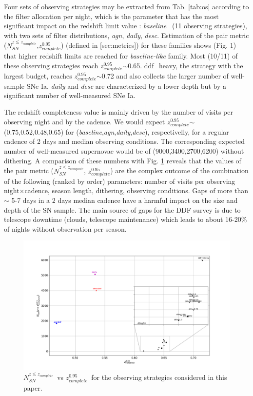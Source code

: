 \documentclass[skiphelvet,twocolumn]{lsstdescnote}
\newcommand{\sne}{{SNe Ia}}
\newcommand{\nsncomp}{{$N_{SN}^{z\leq z_{complete}}$}}
\newcommand{\zcompb}{\mbox{$z_{complete}^{0.95}$}}
\newcommand{\osfamily}[1]{{\it #1}}
\begin{document}

%
%
%
Four sets of observing strategies may be extracted from Tab. \ref{tab:os} according to the filter allocation per night, which is the parameter that has the most significant impact on the redshift limit value : \osfamily{baseline}~ (11 observing strategies), with two sets of filter distributions, \osfamily{agn}, \osfamily{daily}, \osfamily{desc}. Estimation of the pair metric (\nsncomp,\zcompb) (defined in \ref{sec:metrics}) for these families shows (Fig. \ref{fig:nsn_zlim_zoom}) that higher redshift limits are reached for \osfamily{baseline-like} family. Most (10/11) of these observing strategies reach \zcompb$\sim$0.65. ddf\_heavy, the strategy with the largest budget, reaches \zcompb$\sim$0.72 and also collects the larger number of well-sample \sne. \osfamily{daily} and \osfamily{desc} are characterized by a lower depth but by a significant number of well-measured \sne.\par
The redshift completeness value is mainly driven by the number of visits per observing night and by the cadence. We would expect \zcompb$\sim$(0.75,0.52,0.48,0.65) for (\osfamily{baseline},\osfamily{agn},\osfamily{daily},\osfamily{desc}), respectivelly, for a regular cadence of 2 days and median observing conditions. The corresponding expected number of well-measured supernovae would be of (9000,3400,2700,6200) without dithering. A comparison of these numbers with Fig. \ref{fig:nsn_zlim_zoom} reveals that the values of the pair metric (\nsncomp, \zcompb) are the complex outcome of the combination of the following (ranked by order) parameters: number of visits per observing night$\times$cadence, season length, dithering, observing conditions. Gaps of more than $\sim$ 5-7 days in a 2 days median cadence have a harmful
impact on the size and depth of the SN sample. The main source of gaps for the DDF survey is due to telescope downtime (clouds, telescope maintenance) which leads to about 16-20$\%$ of nights without observation per season.  

\begin{figure}[htbp]
\begin{center}
  \includegraphics[width=1.\textwidth]{nsn_zlim_zoom.png}
 \caption{\nsncomp~vs \zcompb~for the observing strategies considered in this paper.}\label{fig:nsn_zlim_zoom}
\end{center}
\end{figure}
\end{document}
